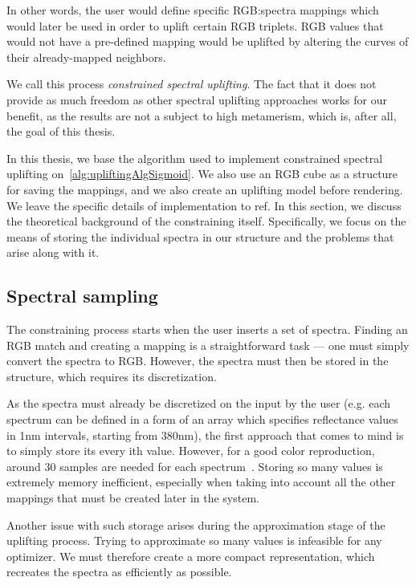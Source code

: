 In other words, the user would define specific RGB:spectra mappings which would later be used in order to uplift certain RGB triplets. RGB values that would not have a pre-defined mapping would be uplifted by altering the curves of their already-mapped neighbors. 

We call this process \emph{constrained spectral uplifting}. The fact that it does not provide as much freedom as other spectral uplifting approaches works for our benefit, as the results are not a subject to high metamerism, which is, after all, the goal of this thesis.

In this thesis, we base the algorithm used to implement constrained spectral uplifting on~\cref{alg:upliftingAlgSigmoid}. We also use an RGB cube as a structure for saving the mappings, and we also create an uplifting model before rendering. We leave the specific details of implementation to ref. In this section, we discuss the theoretical background of the constraining itself. Specifically, we focus on the means of storing the individual spectra in our structure and the problems that arise along with it.

\subsection{Spectral sampling}

The constraining process starts when the user inserts a set of spectra. Finding an RGB match and creating a mapping is a straightforward task --- one must simply convert the spectra to RGB. However, the spectra must then be stored in the structure, which requires its discretization.

As the spectra must already be discretized on the input by the user (e.g. each spectrum can be defined in a form of an array which specifies reflectance values in 1nm intervals, starting from 380nm), the first approach that comes to mind is to simply store its every ith value. However, for a good color reproduction, around 30 samples are needed for each spectrum~\cite{trigonometricMomentsPresentation}. Storing so many values is extremely memory inefficient, especially when taking into account all the other mappings that must be created later in the system.

Another issue with such storage arises during the approximation stage of the uplifting process. Trying to approximate so many values is infeasible for any optimizer. We must therefore create a more compact representation, which recreates the spectra as efficiently as possible.

